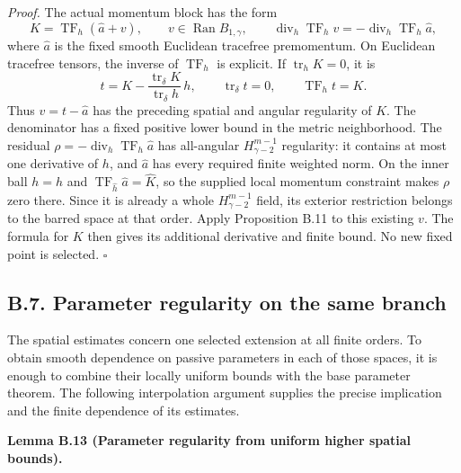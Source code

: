 \documentclass[
  english,
  11pt,
  reqno]{amsart}
\makeatletter
\newcommand{\pandocstatementheading}[1]{%
  \par\if@nobreak\else
    \addpenalty{\@beginparpenalty}%
    \addvspace{.5\baselineskip plus .2\baselineskip minus .2\baselineskip}%
  \fi
  {\normalfont\bfseries #1\par}%
  \nobreak\@afterindenttrue\@afterheading
}
\makeatother
\begin{document}
\emph{Proof.} The actual momentum block has the form%
 \[
K=\operatorname{TF}_h(\widehat a+v),\qquad
v\in\operatorname{Ran}B_{1,\gamma},\qquad
\operatorname{div}_h\operatorname{TF}_h v
              =-\operatorname{div}_h\operatorname{TF}_h\widehat a,
\] where \(\widehat a\) is the fixed smooth Euclidean tracefree
premomentum. On Euclidean tracefree tensors, the inverse of
\(\operatorname{TF}_h\) is explicit. If \(\operatorname{tr}_hK=0\), it
is%
 \[
t=K-\frac{\operatorname{tr}_\delta K}
                  {\operatorname{tr}_\delta h}\,h,
\qquad \operatorname{tr}_\delta t=0,
\qquad \operatorname{TF}_h t=K.
\] Thus \(v=t-\widehat a\) has the preceding spatial and angular
regularity of \(K\). The denominator has a fixed positive lower bound in
the metric neighborhood. The residual
\(\rho=-\operatorname{div}_h\operatorname{TF}_h\widehat a\) has
all-angular \(H^{m-1}_{\gamma-2}\) regularity: it contains at most one
derivative of \(h\), and \(\widehat a\) has every required finite
weighted norm. On the inner ball \(h=\widehat h\) and
\(\operatorname{TF}_{\widehat h}\widehat a=\widehat K\), so the supplied
local momentum constraint makes \(\rho\) zero there. Since it is already
a whole \(H^{m-1}_{\gamma-2}\) field, its exterior restriction belongs
to the barred space at that order. Apply Proposition B.11 to this
existing \(v\). The formula for \(K\) then gives its additional
derivative and finite bound. No new fixed point is selected.
\hfill\(\square\)

\subsection{B.7. Parameter regularity on the same
branch}\label{b.7.-parameter-regularity-on-the-same-branch}\label{sec:online-parameter-promotion}

The spatial estimates concern one selected extension at all finite
orders. To obtain smooth dependence on passive parameters in each of
those spaces, it is enough to combine their locally uniform bounds with
the base parameter theorem. The following interpolation argument
supplies the precise implication and the finite dependence of its
estimates.

\pandocstatementheading{\leavevmode{}\label{lem:online-parameter-promotion}Lemma B.13 (Parameter regularity from uniform higher spatial bounds).}
\end{document}
